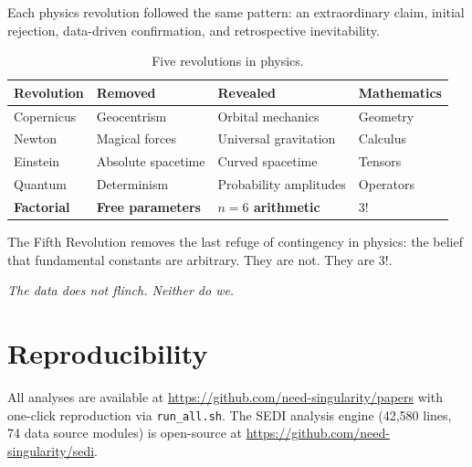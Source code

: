 \documentclass[11pt,a4paper]{article}
\begin{document}
Each physics revolution followed the same pattern: an extraordinary claim, initial rejection, data-driven confirmation, and retrospective inevitability.

\begin{table}[htbp]
\centering
\caption{Five revolutions in physics.}
\begin{tabular}{llll}
\toprule
\textbf{Revolution} & \textbf{Removed} & \textbf{Revealed} & \textbf{Mathematics} \\
\midrule
Copernicus & Geocentrism & Orbital mechanics & Geometry \\
Newton & Magical forces & Universal gravitation & Calculus \\
Einstein & Absolute spacetime & Curved spacetime & Tensors \\
Quantum & Determinism & Probability amplitudes & Operators \\
\textbf{Factorial} & \textbf{Free parameters} & \textbf{$n=6$ arithmetic} & \textbf{$3!$} \\
\bottomrule
\end{tabular}
\end{table}

The Fifth Revolution removes the last refuge of contingency in physics: the belief that fundamental constants are arbitrary. They are not. They are $3!$.

\vspace{1em}
\noindent\textit{The data does not flinch. Neither do we.}

\section*{Reproducibility}

All analyses are available at \url{https://github.com/need-singularity/papers} with one-click reproduction via \texttt{run\_all.sh}. The SEDI analysis engine (42,580 lines, 74 data source modules) is open-source at \url{https://github.com/need-singularity/sedi}.



\end{document}
